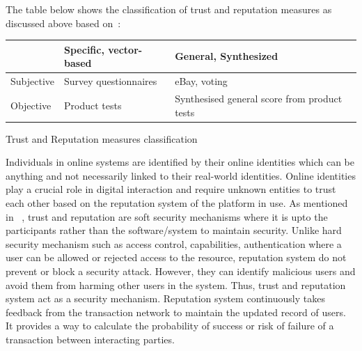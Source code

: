 The table below shows the classification of trust and reputation measures as
discussed above based on~\cite{ josang2007survey}: 
 \begin{center} \label{table:classificationTrust}
	\begin{tabularx}{\textwidth }{|X| X| X| }
		\hline
		 & Specific, vector-based & General, Synthesized \\
		 \hline
		Subjective & Survey questionnaires & eBay, voting \\
		\hline
		Objective & Product tests & Synthesised general score from product tests 
		\hline
	\end{tabularx}
	\caption{Trust and Reputation measures classification}
\end{center}
Individuals in online systems are identified by their online identities which
can be anything and not necessarily linked to their real-world identities.
Online identities play a crucial role in digital interaction and require
unknown entities to trust each other based on the reputation system of the
platform in use. As mentioned in ~\cite{rasmusson1996simulated}, trust and
reputation are soft security mechanisms where it is upto the participants
rather than the software/system to maintain security. Unlike hard security
mechanism such as access control, capabilities, authentication where a user can
be allowed or rejected access to the resource, reputation system do not prevent
or block a security attack. However, they can identify malicious users and
avoid them from harming other users in the system. Thus, trust and reputation
system act as a security mechanism. Reputation system continuously takes
feedback from the transaction network to maintain the updated record of users.
It provides a way to calculate the probability of success or risk of failure of
a transaction between interacting parties.  


